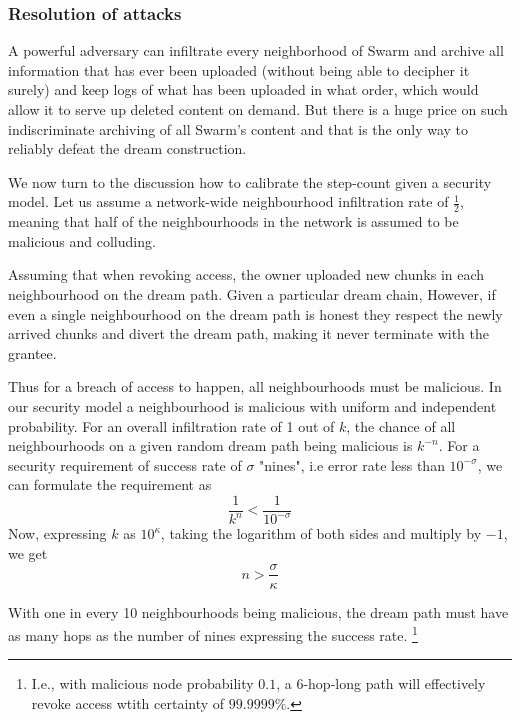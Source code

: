 \subsubsection{Resolution of attacks}


A powerful adversary can infiltrate every neighborhood of Swarm and archive all information that has ever been uploaded (without being able to decipher it surely) and keep logs of what has been uploaded in what order, which would allow it to serve up deleted content on demand. But there is a huge price on such indiscriminate archiving of all Swarm's content and that is the only way to reliably defeat the dream construction.

We now turn to the discussion how to calibrate the step-count given a security model. Let us assume a network-wide neighbourhood infiltration rate of $\frac{1}{2}$, meaning that  half of the neighbourhoods in the network is assumed  to be  malicious and colluding. 

Assuming that when  revoking access, the owner uploaded new chunks in each neighbourhood on the dream path. 
Given a particular dream chain, 
However, if even  a single neighbourhood on the dream path is honest they respect the newly arrived chunks and divert the dream path, making it never terminate with the grantee. 


Thus for  a breach of access to happen, all neighbourhoods must be malicious.
In our security model a neighbourhood is malicious with  uniform and independent probability.  For an overall infiltration rate of 1 out of $k$, the chance of all neighbourhoods on a given random dream path being malicious is $k^{-n}$. For a security requirement of success rate of $\sigma$ "nines", i.e error rate less than $10^{-\sigma}$,  we can formulate the requirement as
%
\begin{equation}
    \frac{1}{k^n}< \frac{1}{10^{-\sigma}}
\end{equation}
Now, expressing $k$ as $10^\kappa$, taking the logarithm of both sides and multiply by $-1$, we get
%
\begin{equation}
    n > \frac{\sigma}{\kappa}
\end{equation}

With one in every 10 neighbourhoods being malicious, the dream path must have as many hops as the number of nines expressing the success rate.%
%
\footnote{I.e., with malicious node probability $0.1$, a 6-hop-long path will effectively revoke access wtith certainty of $99.9999\%$.}

